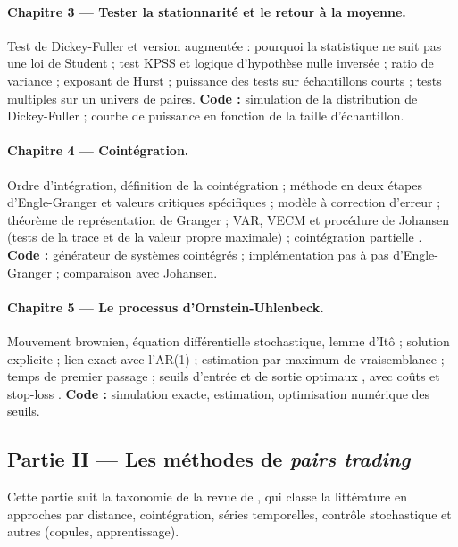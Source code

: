\documentclass[11pt,a4paper]{article}
\begin{document}
\paragraph{Chapitre 3 — Tester la stationnarité et le retour à la moyenne.}
Test de Dickey-Fuller et version augmentée \citep{dickeyfuller1979} : pourquoi la statistique ne suit pas une loi de Student ; test KPSS \citep{kpss1992} et logique d'hypothèse nulle inversée ; ratio de variance \citep{lomackinlay1988} ; exposant de Hurst ; puissance des tests sur échantillons courts ; tests multiples sur un univers de paires. \textbf{Code :} simulation de la distribution de Dickey-Fuller ; courbe de puissance en fonction de la taille d'échantillon.

\paragraph{Chapitre 4 — Cointégration.}
Ordre d'intégration, définition de la cointégration ; méthode en deux étapes d'Engle-Granger et valeurs critiques spécifiques \citep{englegranger1987} ; modèle à correction d'erreur ; théorème de représentation de Granger ; VAR, VECM et procédure de Johansen (tests de la trace et de la valeur propre maximale) \citep{johansen1991} ; cointégration partielle \citep{clegg2018}. \textbf{Code :} générateur de systèmes cointégrés ; implémentation pas à pas d'Engle-Granger ; comparaison avec Johansen.

\paragraph{Chapitre 5 — Le processus d'Ornstein-Uhlenbeck.}
Mouvement brownien, équation différentielle stochastique, lemme d'Itô ; solution explicite \citep{uhlenbeck1930} ; lien exact avec l'AR(1) ; estimation par maximum de vraisemblance ; temps de premier passage ; seuils d'entrée et de sortie optimaux \citep{bertram2010}, avec coûts et stop-loss \citep{leungli2015,leungli2016}. \textbf{Code :} simulation exacte, estimation, optimisation numérique des seuils.

\subsection{Partie II — Les méthodes de \emph{pairs trading}}

Cette partie suit la taxonomie de la revue de \citet{krauss2017survey}, qui classe la littérature en approches par distance, cointégration, séries temporelles, contrôle stochastique et \og autres\fg{} (copules, apprentissage).
\end{document}
